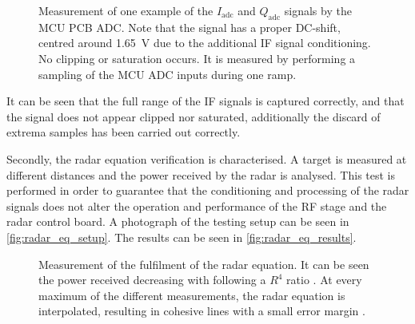 \begin{figure}[htb]
	\centering
	
	\caption{Measurement of one example of the  $I_\mathrm{adc}$ and $Q_\mathrm{adc}$ signals by the MCU PCB ADC. Note that the signal has a proper DC-shift, centred around \SI{1.65}{\volt} due to the additional IF signal conditioning. No clipping or saturation occurs. It is measured by performing a sampling of the MCU ADC inputs during one ramp.} %
	\label{fig:mcu_test_adc}
\end{figure}

It can be seen that the full range of the IF signals is captured correctly, and that the signal does not appear clipped nor saturated, additionally the discard of extrema samples has been carried out correctly.

Secondly, the radar equation \cite{Pozar2011} verification is characterised. A target is measured at different distances and the power received by the radar is analysed. This test is performed in order to guarantee that the conditioning and processing of the radar signals does not alter the operation and performance of the RF stage and the radar control board. A photograph of the testing setup can be seen in \cref{fig:radar_eq_setup}. The results can be seen in \cref{fig:radar_eq_results}.

\begin{figure}[htb]
	\centering
	\caption[Measurement of the fulfilment of the radar equation. It can be seen the power received decreasing with ratio $R^4$. At every maximum of the different distances measurement, the radar equation is interpolated, resulting in cohesive lines with a small error margin.]{Measurement of the fulfilment of the radar equation. It can be seen the power received decreasing with following a $R^4$ ratio \cite{Pozar2011}. At every maximum of the different measurements, the radar equation is interpolated, resulting in cohesive lines with a small error margin \cite{Richards2010,Pozar2011}. \label{fig:radar_eq}}
\end{figure}

